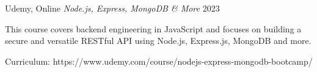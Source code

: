 \begin{cventries}
\cventry
  {Udemy, Online} %
  {\textit{Node.js, Express, MongoDB \& More}} %
  {} %
  {2023} %
  {
    \begin{cvitems} %
      \item {This course covers backend engineering in JavaScript and focuses on building a secure and versatile RESTful API using Node.js, Express.js, MongoDB and more.}
      \item {Curriculum: https://www.udemy.com/course/nodejs-express-mongodb-bootcamp/}
    \end{cvitems}
  }
  \newline


  
\end{cventries}
